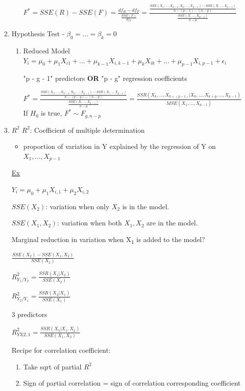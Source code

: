 \documentclass[11pt]{article}
\begin{document}
\begin{enumerate}
\begin{enumerate}
\(F^* = SSE(R) - SSE(F) = \frac{df_R - df_F}{\frac{SSE(F)}{df_F}} = \frac{
\frac{SSE(X_1, ..., X_{k - 1}, X_k, ..., X_{p - 1}) - SSE(X, ..., X_{p -
1})}{n - (p - 1) - (n - p)}}{\frac{SSE(X, ..., X_{p - 1})}{n - p}}\)
\end{enumerate}


\item Hypothesis Test - \(\beta_0 = ... = \beta_k = 0\)
\label{sec:org602bfc7}
\begin{enumerate}
\item Reduced Model
\label{sec:orgbbb2667}
\(Y_i = \mu_0 + \mu_1 X_{i1} + ... + \mu_{k - 1} X_{i,k - 1} + \mu_k X_{ik} + ... + \mu_{p - 1} X_{i, p - 1} + \epsilon_i\)

"p - g - 1" predictors \textbf{OR} "p - g" regression coefficients

\(F^* = \frac{\frac{SSE(X_1, ..., X_{k - 1}, X_k, ..., X_{p - 1}) - SSE(X, ..., X_{p -
1})}{n - (p - g) - (n - p)}}{\frac{SSE(X, ..., X_{p - 1})}{n - p}} = \frac{SSR(X_k, ..., X_{k + (g - 1)} |
X_k, ..., X_{k + g}, ..., X_{p - 1})}{MSE(X_1, ..., X_{p - 1})}\)
If \(H_0\) is true, \(F^* \sim F_{g, n - p}\)
\end{enumerate}
\item \(R^2\)
\label{sec:org79e0a93}
\(R^2\): Coefficient of multiple determination
\begin{itemize}
\item proportion of variation in Y explained by the regression of Y on \(X_1, ...,
  X_{p - 1}\)
\end{itemize}

\uline{Ex}

\(Y_i = \mu_0 + \mu_1 X_{i,1} + \mu_2 X_{i,2}\)

\(SSE(X_2)\): variation when only \(X_2\) is in the model.

\(SSE(X_1, X_2)\): variation when both \(X_1,X_2\) are in the model.

Marginal reduction in variation when X\textsubscript{1} is added to the model?

\(\frac{SSE(X_2) - SSE(X_1, X_2)}{SSE(X_2)}\)

\(R_{Y_1/Y_2}^2 = \frac{SSR(X_1 | X_2)}{SSE(X_2)}\)

\(R_{Y_2/Y_1}^2 = \frac{SSR(X_2 | X_1)}{SSE(X_1)}\)

3 predictors

\(R_{Y3|2,1}^2 = \frac{SSR(X_3 | X_1, X_2)}{SSE(X_1, X_2)}\)

Recipe for correlation coefficient:
\begin{enumerate}
\item Take sqrt of partial \(R^2\)
\item Sign of partial correlation = sign of correlation corresponding coefficient
\end{enumerate}
\end{enumerate}
\end{document}
